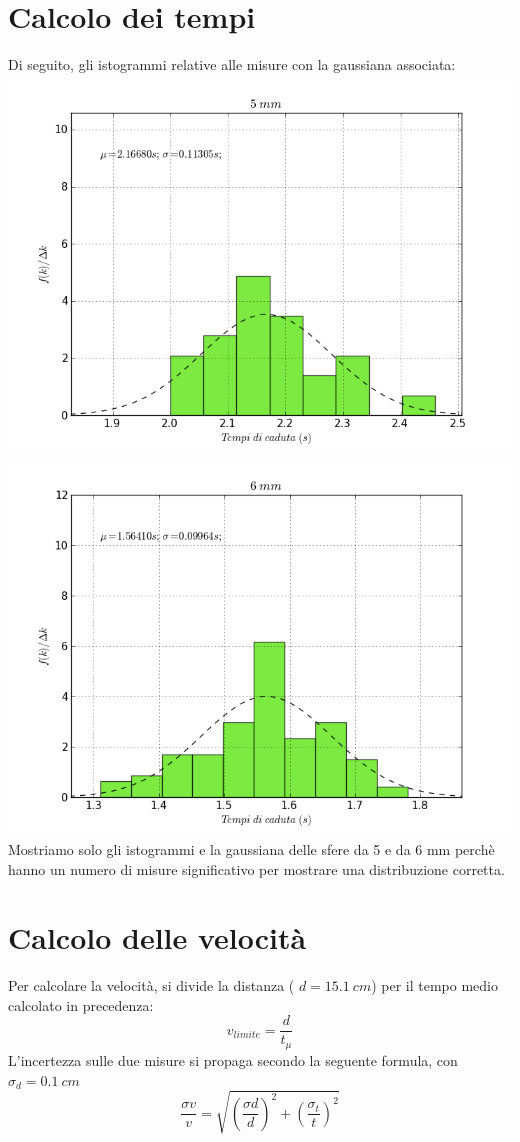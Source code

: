 \section{Calcolo dei tempi}
Di seguito, gli istogrammi relative alle misure con la gaussiana associata:
\\
\includegraphics[scale=0.4]{"../grafici/5mm"}
\includegraphics[scale=0.4]{"../grafici/6mm"}
Mostriamo solo gli istogrammi e la gaussiana delle sfere da 5 e da 6 mm perchè hanno un numero di misure significativo per mostrare una distribuzione corretta.

\section{Calcolo delle velocità}
Per calcolare la velocità, si divide la distanza ( $ d= 15.1\ cm$) per il tempo medio calcolato in precedenza:
$$ v_{limite} = \frac{d}{t_{\mu}} $$
L'incertezza sulle due misure si propaga secondo la seguente formula, con $\sigma_d=0.1 \ cm$
\begin{equation}
 \frac{\sigma v}{v} = \sqrt{\left(\frac{\sigma d}{d}\right)^2 + \left(\frac{\sigma_t}{t}\right)^2} 
\end{equation}

